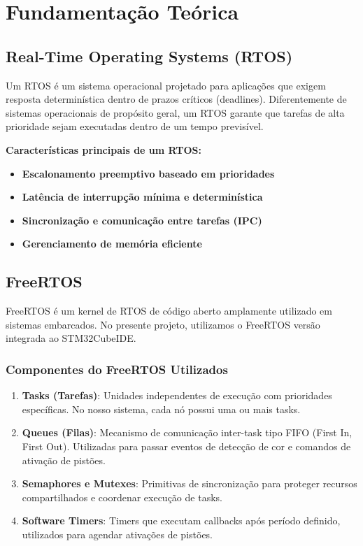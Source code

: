 \documentclass[12pt,a4paper]{article}
\begin{document}
\section{Fundamentação Teórica}

\subsection{Real-Time Operating Systems (RTOS)}

Um RTOS é um sistema operacional projetado para aplicações que exigem resposta determinística dentro de prazos críticos (deadlines). Diferentemente de sistemas operacionais de propósito geral, um RTOS garante que tarefas de alta prioridade sejam executadas dentro de um tempo previsível.

\textbf{Características principais de um RTOS:}

\begin{itemize}
    \item \textbf{Escalonamento preemptivo baseado em prioridades}
    \item \textbf{Latência de interrupção mínima e determinística}
    \item \textbf{Sincronização e comunicação entre tarefas (IPC)}
    \item \textbf{Gerenciamento de memória eficiente}
\end{itemize}

\subsection{FreeRTOS}

FreeRTOS é um kernel de RTOS de código aberto amplamente utilizado em sistemas embarcados. No presente projeto, utilizamos o FreeRTOS versão integrada ao STM32CubeIDE.

\subsubsection{Componentes do FreeRTOS Utilizados}

\begin{enumerate}
    \item \textbf{Tasks (Tarefas)}: Unidades independentes de execução com prioridades específicas. No nosso sistema, cada nó possui uma ou mais tasks.

    \item \textbf{Queues (Filas)}: Mecanismo de comunicação inter-task tipo FIFO (First In, First Out). Utilizadas para passar eventos de detecção de cor e comandos de ativação de pistões.

    \item \textbf{Semaphores e Mutexes}: Primitivas de sincronização para proteger recursos compartilhados e coordenar execução de tasks.

    \item \textbf{Software Timers}: Timers que executam callbacks após período definido, utilizados para agendar ativações de pistões.
\end{enumerate}
\end{document}
